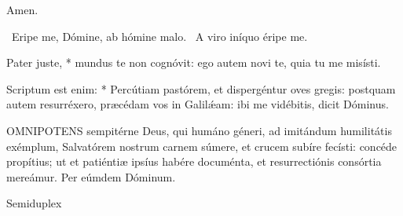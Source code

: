 Amen.

\V\ Eripe me, Dómine, ab hómine malo. \R\ A viro iníquo éripe me.

 Pater juste, * mundus te non cognóvit: ego autem novi te, quia tu me misísti.


 Scriptum est enim: * Percútiam pastórem, et dispergéntur oves gregis: postquam autem resurréxero, præcédam vos in Galilǽam: ibi me vidébitis, dicit Dóminus.


\lettrine[lines=2]{O}{MNIPOTENS} sempitérne Deus, qui humáno géneri, ad imitándum humilitátis exémplum, Salvatórem nostrum carnem súmere, et crucem subíre fecísti: concéde propítius; ut et patiéntiæ ipsíus habére documénta, et resurrectiónis consórtia mereámur. Per eúmdem Dóminum.

\sectionornament



 Semiduplex

